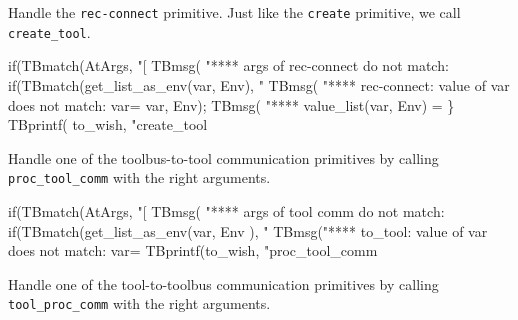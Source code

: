 
Handle the {\tt rec-connect} primitive. Just like the {\tt create} primitive,
we call {\tt create\_tool}.

\nwenddocs{}\endmoddef\nwstartdeflinemarkup{}\nwenddeflinemarkup
  if(TBmatch(AtArgs, "[%
    TBmsg( "**** args of rec-connect do not match: %
  if(TBmatch(get_list_as_env(var, Env), "%
    TBmsg( "**** rec-connect: value of var does not match: var=%
                                                                    var, Env);
    TBmsg( "**** value_list(var, Env) = %
  \}
  TBprintf( to_wish, "create_tool %
\nwendcode{}\nwdocspar


Handle one of the toolbus-to-tool communication primitives
by calling {\tt proc\_tool\_comm} with the right arguments.

\nwenddocs{}\endmoddef\nwstartdeflinemarkup{}\nwenddeflinemarkup
  if(TBmatch(AtArgs, "[%
    TBmsg( "**** args of tool comm do not match:%
  if(TBmatch(get_list_as_env(var, Env ), "%
    TBmsg("**** to_tool: value of var does not match: var=%
  TBprintf(to_wish, "proc_tool_comm %
\nwendcode{}\nwdocspar


Handle one of the tool-to-toolbus communication primitives
by calling {\tt tool\_proc\_comm} with the right arguments.


